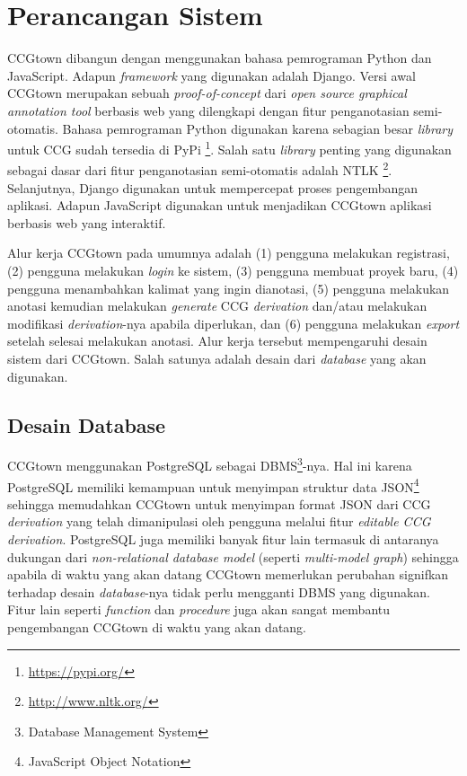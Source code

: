 \chapter{Perancangan Sistem}
CCGtown dibangun dengan menggunakan bahasa pemrograman Python dan JavaScript.
Adapun \textit{framework} yang digunakan adalah Django.
Versi awal CCGtown merupakan sebuah \textit{proof-of-concept} dari
\textit{open source graphical annotation tool} berbasis web yang dilengkapi dengan fitur
penganotasian semi-otomatis.
Bahasa pemrograman Python digunakan karena sebagian besar \textit{library} untuk CCG
sudah tersedia di PyPi \footnote{\url{https://pypi.org/}}.
Salah satu \textit{library} penting yang digunakan sebagai dasar dari fitur penganotasian
semi-otomatis adalah NTLK \footnote{\url{http://www.nltk.org/}}.
Selanjutnya, Django digunakan untuk mempercepat proses pengembangan aplikasi.
Adapun JavaScript digunakan untuk menjadikan CCGtown aplikasi berbasis web yang interaktif.

Alur kerja CCGtown pada umumnya adalah (1) pengguna melakukan registrasi, (2) pengguna
melakukan \textit{login} ke sistem, (3) pengguna membuat proyek baru, (4) pengguna
menambahkan kalimat yang ingin dianotasi, (5) pengguna melakukan anotasi kemudian melakukan
\textit{generate} CCG \textit{derivation} dan/atau melakukan modifikasi
\textit{derivation}-nya apabila diperlukan, dan (6) pengguna melakukan \textit{export}
setelah selesai melakukan anotasi. Alur kerja tersebut mempengaruhi desain sistem dari
CCGtown. Salah satunya adalah desain dari \textit{database} yang akan digunakan.


\section{Desain Database}
CCGtown menggunakan PostgreSQL sebagai
DBMS\footnote{Database Management System}-nya.
Hal ini karena PostgreSQL memiliki kemampuan untuk menyimpan struktur data
JSON\footnote{JavaScript Object Notation} sehingga memudahkan CCGtown untuk menyimpan
format JSON dari CCG \textit{derivation} yang telah dimanipulasi oleh pengguna melalui
fitur \textit{editable CCG derivation}.
PostgreSQL juga memiliki banyak fitur lain termasuk di antaranya dukungan
dari \textit{non-relational database model} (seperti \textit{multi-model graph})
sehingga apabila di waktu yang akan datang CCGtown memerlukan perubahan signifkan
terhadap desain \textit{database}-nya tidak perlu mengganti DBMS yang digunakan.
Fitur lain seperti \textit{function} dan \textit{procedure} juga akan sangat membantu
pengembangan CCGtown di waktu yang akan datang.

